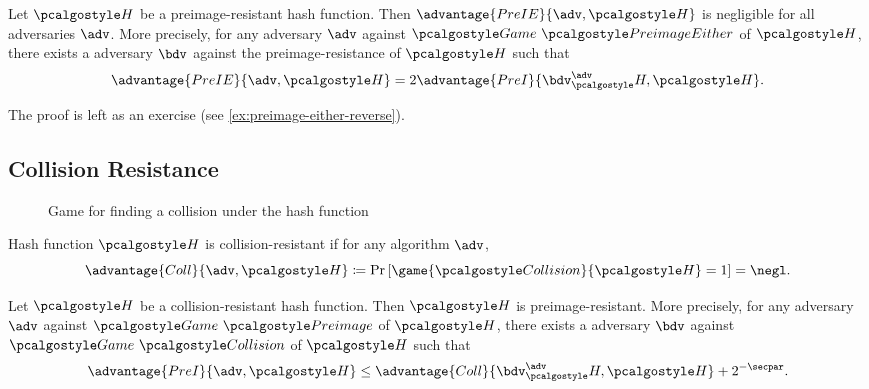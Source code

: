 \begin{proposition}\label{prop:preimage-either-reverse}
  Let $\algo{H}$ be a preimage-resistant hash function.
  Then $\advantage{PreIE}{\adv, \algo{H}}$ is negligible for all \ppt adversaries $\adv$.
  More precisely, for any \ppt adversary $\adv$ against $\Game~\algo{PreimageEither}$ of $\algo{H}$, there exists a \ppt adversary $\bdv$ against the preimage-resistance of $\algo{H}$ such that
    \[
    \advantage{PreIE}{\adv, \algo{H}} = 2\advantage{PreI}{\bdv^\adv_\algo{H}, \algo{H}}.
    \]
\end{proposition}

The proof is left as an exercise (see \autoref{ex:preimage-either-reverse}).


\subsection{Collision Resistance}

\begin{figure}[tbhp]
  \begin{center}
    \begin{tcolorbox}[width=8cm]
      \begin{pchstack}[center]
      \end{pchstack}
    \end{tcolorbox}
  \end{center}
  \caption{Game for finding a collision under the hash function \label{fig:break-hash-collision}}
\end{figure}

\begin{definition}
  Hash function $\algo{H}$ is collision-resistant if for any \ppt algorithm $\adv$,
 \[
  \advantage{Coll}{\adv, \algo{H}} \defeq \pr{\game{\algo{Collision}}{\algo{H}} = 1} = \negl.
 \]
\end{definition}

\begin{theorem}\label{thm:collision-implies-preimage}
  Let $\algo{H}$ be a collision-resistant hash function. Then $\algo{H}$ is preimage-resistant.
  More precisely, for any \ppt adversary $\adv$ against $\Game~\algo{Preimage}$ of $\algo{H}$, there exists a \ppt adversary $\bdv$ against $\Game~\algo{Collision}$ of $\algo{H}$ such that
    \[
    \advantage{PreI}{\adv, \algo{H}} \le \advantage{Coll}{\bdv^\adv_\algo{H}, \algo{H}} + 2^{-\secpar}.
    \]

\end{theorem}

